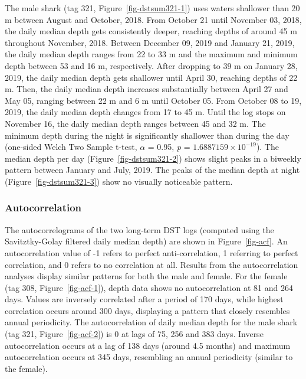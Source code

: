 \documentclass[
  authoryear,
  review,
  3p]{elsarticle}
\begin{document}
The male shark (tag 321, Figure~\ref{fig-dstsum321-1}) uses waters
shallower than 20 m between August and October, 2018. From October 21
until November 03, 2018, the daily median depth gets consistently
deeper, reaching depths of around 45 m throughout November, 2018.
Between December 09, 2019 and January 21, 2019, the daily median depth
ranges from 22 to 33 m and the maximum and minimum depth between 53 and
16 m, respectively. After dropping to 39 m on January 28, 2019, the
daily median depth gets shallower until April 30, reaching depths of 22
m. Then, the daily median depth increases substantially between April 27
and May 05, ranging between 22 m and 6 m until October 05. From October
08 to 19, 2019, the daily median depth changes from 17 to 45 m. Until
the log stops on November 16, the daily median depth ranges between 45
and 32 m. The minimum depth during the night is significantly shallower
than during the day (one-sided Welch Two Sample t-test, \(\alpha\) =
0.95, \emph{p} = \ensuremath{1.6887159\times 10^{-19}}). The median
depth per day (Figure~\ref{fig-dstsum321-2}) shows slight peaks in a
biweekly pattern between January and July, 2019. The peaks of the median
depth at night (Figure~\ref{fig-dstsum321-3}) show no visually
noticeable pattern.

\hypertarget{sec-resacf}{%
\subsubsection{Autocorrelation}\label{sec-resacf}}

The autocorrelograms of the two long-term DST logs (computed using the
Savitztky-Golay filtered daily median depth) are shown in
Figure~\ref{fig-acf}. An autocorrelation value of -1 refers to perfect
anti-correlation, 1 referring to perfect correlation, and 0 refers to no
correlation at all. Results from the autocorrelation analyses display
similar patterns for both the male and female. For the female (tag 308,
Figure~\ref{fig-acf-1}), depth data shows no autocorrelation at 81 and
264 days. Values are inversely correlated after a period of 170 days,
while highest correlation occurs around 300 days, displaying a pattern
that closely resembles annual periodicity. The autocorrelation of daily
median depth for the male shark (tag 321, Figure~\ref{fig-acf-2}) is 0
at lags of 75, 256 and 383 days. Inverse autocorrelation occurs at a lag
of 138 days (around 4.5 months) and maximum autocorrelation occurs at
345 days, resembling an annual periodicity (similar to the female).
\end{document}
